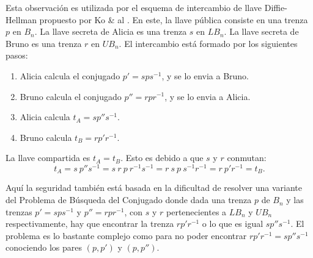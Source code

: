 \documentclass[12pt]{book}
\theoremstyle{definition}
\begin{document}
Esta observación es utilizada por el esquema de intercambio de llave Diffie-Hellman propuesto por Ko \& al \cite{Ko}. En este, la llave pública consiste en una trenza $p$ en $B_n$. La llave secreta de Alicia es una trenza $s$ en $LB_n$. La llave secreta de Bruno es una trenza $r$ en $UB_n$. El intercambio está formado por los siguientes pasos:

\begin{enumerate}
\item Alicia calcula el conjugado $p'=sps^{-1}$, y se lo envia a Bruno.
\item Bruno calcula el conjugado $p''=rpr^{-1}$, y se lo envia a Alicia.
\item Alicia calcula $t_A = sp''s^{-1}$.
\item Bruno calcula $t_B = rp'r^{-1}$. 
\end{enumerate}

La llave compartida es $t_A = t_B$. Esto es debido a que $s$ y $r$ conmutan:
$$t_A=s\ p''s^{-1}=s\ r\ p\ r^{-1}s^{-1} = r\ s\ p\ s^{-1}r^{-1} = r\ p'r^{-1}=t_B.$$

Aquí la seguridad también está basada en la dificultad de resolver una variante del Problema de Búsqueda del Conjugado donde dada una trenza $p$ de $B_n$ y las trenzas $p'=sps^{-1}$ y $p''=rpr^{-1}$, con $s$ y $r$ pertenecientes a $LB_n$ y $UB_n$ respectivamente, hay que encontrar la trenza $rp'r^{-1}$ o lo que es igual $sp''s^{-1}$. El problema es lo bastante complejo como para no poder encontrar $rp'r^{-1}=sp''s^{-1}$ conociendo los pares $(p,p')$ y $(p,p'')$.
\end{document}
